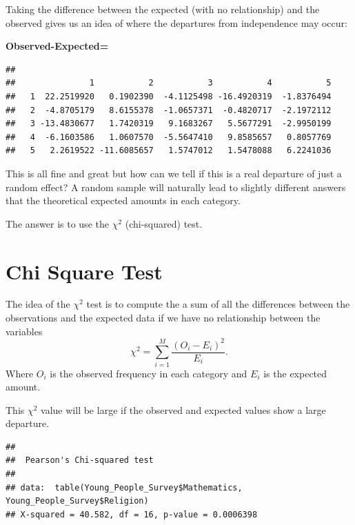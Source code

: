 \documentclass[
]{book}
\newenvironment{Shaded}{\begin{snugshade}}{\end{snugshade}}
\newcommand{\FunctionTok}[1]{\textcolor[rgb]{0.00,0.00,0.00}{#1}}
\newcommand{\NormalTok}[1]{#1}
\newcommand{\SpecialCharTok}[1]{\textcolor[rgb]{0.00,0.00,0.00}{#1}}
\theoremstyle{definition}
\theoremstyle{definition}
\theoremstyle{definition}
\theoremstyle{definition}
\theoremstyle{remark}
\begin{document}
Taking the difference between the expected (with no relationship) and the observed gives us an idea of where the departures from independence may occur:

\textbf{Observed-Expected=}

\begin{verbatim}
##    
##               1           2           3           4           5
##   1  22.2519920   0.1902390  -4.1125498 -16.4920319  -1.8376494
##   2  -4.8705179   8.6155378  -1.0657371  -0.4820717  -2.1972112
##   3 -13.4830677   1.7420319   9.1683267   5.5677291  -2.9950199
##   4  -6.1603586   1.0607570  -5.5647410   9.8585657   0.8057769
##   5   2.2619522 -11.6085657   1.5747012   1.5478088   6.2241036
\end{verbatim}

This is all fine and great but how can we tell if this is a real departure of just a random effect? A random sample will naturally lead to slightly different answers that the theoretical expected amounts in each category.

The answer is to use the \(\chi^2\) (chi-squared) test.

\hypertarget{chi-square-test}{%
\section{Chi Square Test}\label{chi-square-test}}

The idea of the \(\chi^2\) test is to compute the a sum of all the differences between the observations and the expected data if we have no relationship between the variables \[\chi^2=\sum_{i=1}^M \frac{(O_i-E_i)^2}{E_i}.\] Where \(O_i\) is the observed frequency in each category and \(E_i\) is the expected amount.

This \(\chi^2\) value will be large if the observed and expected values show a large departure.

\begin{Shaded}
\end{Shaded}

\begin{verbatim}
## 
##  Pearson's Chi-squared test
## 
## data:  table(Young_People_Survey$Mathematics, Young_People_Survey$Religion)
## X-squared = 40.582, df = 16, p-value = 0.0006398
\end{verbatim}
\end{document}
